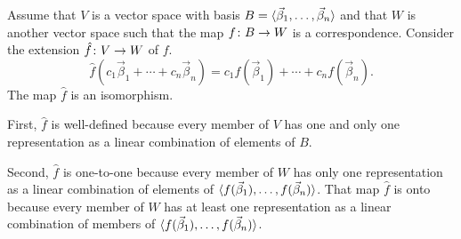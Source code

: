 \begin{exercises}
\begin{answer}
      Assume that \( V \) is a vector space with basis
      \( B=\langle\vec{\beta}_1,\ldots,\vec{\beta}_n\rangle \) and that \( W \)
      is another vector space such that the map \( \mbox{$f\colon B\to W$} \) is
      a correspondence.
      Consider the extension \( \mbox{$\hat{f}\colon V\to W$} \) of \( f \).
      \begin{equation*}
        \hat{f}(c_1\vec{\beta}_1+\cdots+c_n\vec{\beta}_n)=
        c_1f(\vec{\beta}_1)+\cdots+c_nf(\vec{\beta}_n).
      \end{equation*}
      The map \( \hat{f} \) is an isomorphism.

      First, \( \hat{f} \) is well-defined because every member of \( V \)
      has one and only one representation as a linear combination of elements
      of \( B \).

      Second, \( \hat{f} \) is one-to-one because every member of \( W \) has
      only one representation as a linear combination of elements of
      \( \langle f(\vec{\beta}_1),\dots,f(\vec{\beta}_n)\rangle \).
      That map \( \hat{f} \) is onto because every member of \( W \) has at
      least one representation as a linear combination of members of
      \( \langle f(\vec{\beta}_1),\dots,f(\vec{\beta}_n)\rangle \).


\end{answer}
\end{exercises}
